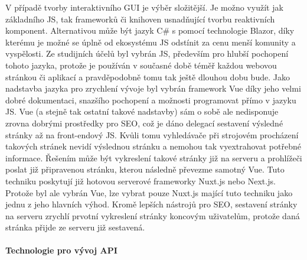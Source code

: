			V případě tvorby interaktivního \Ac{GUI} je výběr složitější.
			Je možno využít jak základního \ac{JS}, tak frameworků či knihoven usnadňující tvorbu reaktivních komponent.
			Alternativou může být jazyk C\# s pomocí technologie Blazor, díky kterému je možné se úplně od ekosystému
			\ac{JS} odstínit za cenu menší komunity a vyspělosti.
			Ze studijních účelů byl vybrán \ac{JS}, především pro hlubší pochopení tohoto jazyka, protože je používán v současné
			době téměř každou webovou stránkou či aplikací a pravděpodobně tomu tak ještě dlouhou dobu bude.
			Jako nadstavba jazyka pro zrychlení vývoje byl vybrán framework Vue díky jeho velmi dobré dokumentaci, snazšího
			pochopení a možnosti programovat přímo v jazyku \ac{JS}.
			Vue (a stejně tak ostatní takové nadstavby) sám o sobě ale nedisponuje zrovna dobrými prostředky pro \Ac{SEO},
			což je dáno delegací sestavení výsledné stránky až na front-endový \ac{JS}.
			Kvůli tomu vyhledávače při strojovém procházení takových stránek nevidí výslednou stránku a nemohou tak
			vyextrahovat potřebné informace.
			Řešením může být vykreslení takové stránky již na serveru a prohlížeči poslat již připravenou stránku, kterou
			následně převezme samotný Vue.
			Tuto techniku poskytují již hotovou serverové frameworky Nuxt.js nebo Next.js.
			Protože byl ale vybrán Vue, lze vybrat pouze Nuxt.js mající tuto techniku jako jednu z jeho hlavních výhod.
			Kromě lepších nástrojů pro \ac{SEO}, sestavení stránky na serveru zrychlí prvotní vykreslení stránky
			koncovým uživatelům, protože daná stránka přijde ze serveru již sestavená.

			\paragraph{Technologie pro vývoj API}

